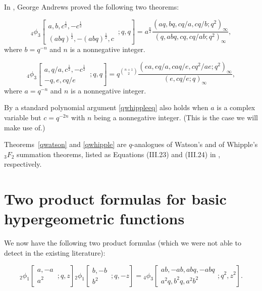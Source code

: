 In \cite{A}, George Andrews proved the following two theorems:
\begin{theorem}\label{qwatson}
\begin{equation}
{}_4\phi_3\!\left[\begin{matrix}a,b,c^{\frac 12},-c^{\frac 12}\\
(abq)^{\frac 12},-(abq)^{\frac 12},c
\end{matrix}\,;q,q\right]=a^{\frac n2}
\frac{(aq,bq,cq/a,cq/b;q^2)_\infty}
{(q,abq,cq,cq/ab;q^2)_\infty},
\end{equation}
where $b=q^{-n}$ and $n$ is a nonnegative integer.
\end{theorem}

\begin{theorem}\label{qwhipple}
\begin{equation}\label{qwhippleeq}
{}_4\phi_3\!\left[\begin{matrix}a,q/a,c^{\frac 12},-c^{\frac 12}\\
-q,e,cq/e\end{matrix}\,;q,q\right]=q^{\binom{n+1}2}
\frac{(ea,eq/a,caq/e,cq^2/ae;q^2)_\infty}
{(e,cq/e;q)_\infty},
\end{equation}
where $a=q^{-n}$ and $n$ is a nonnegative integer.
\end{theorem}
By a standard polynomial argument \eqref{qwhippleeq} also holds
when $a$ is a complex variable but $c=q^{-2n}$ with
$n$ being a nonnegative integer. (This is the case we will
make use of.)

Theorems~\ref{qwatson} and \ref{qwhipple} are $q$-analogues of Watson's
and of Whipple's $_3F_2$ summation theorems, listed as
Equations (III.23) and (III.24) in \cite[p.~245]{Sl}, respectively.

\section{Two product formulas for basic hypergeometric
functions}

We now have the following two product formulas (which we were
not able to detect in the existing literature):
\begin{theorem}\label{qwatsonprod}
\begin{equation}
{}_2\phi_1\!\left[\begin{matrix}a,-a\\
a^2\end{matrix}\,;q,z\right]
{}_2\phi_1\!\left[\begin{matrix}b,-b\\
b^2\end{matrix}\,;q,-z\right]
={}_4\phi_3\!\left[\begin{matrix}ab,-ab,abq,-abq\\
a^2q,b^2q,a^2b^2\end{matrix};q^2,z^2\right].
\end{equation}
\end{theorem}

